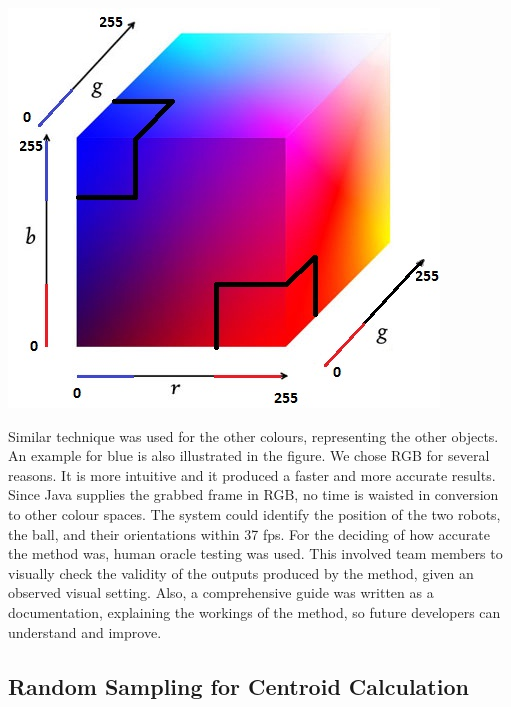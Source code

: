 \includegraphics[scale=1]{RGB_Space.jpg} 

Similar technique was used for the other colours, representing the other objects. An example for blue is also illustrated in the figure. We chose RGB for several reasons. It is more intuitive and it produced a faster and more accurate results. Since Java supplies the grabbed frame in RGB, no time is waisted in conversion to other colour spaces. The system could identify the position of the two robots, the ball, and their orientations within 37 fps. For the deciding of how accurate the method was, human oracle testing was used. This involved team members to visually check the validity of the outputs produced by the method, given an observed visual setting. Also, a comprehensive guide was written as a documentation, explaining the workings of the method, so future developers can understand and improve. 

\subsection{Random Sampling for Centroid Calculation}

